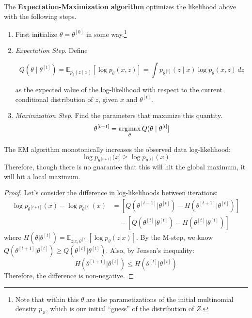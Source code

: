   \begin{algo}[EM Algorithm]
    The \textbf{Expectation-Maximization algorithm} optimizes the likelihood above with the following steps. 
    \begin{enumerate}
      \item First initialize $\theta = \theta^{[0]}$ in some way.\footnote{Note that within this $\theta$ are the parametizations of the initial multinomial density $p_Z$, which is our initial ``guess'' of the distribution of $Z$.}

      \item \textit{Expectation Step}. Define 

      \begin{equation}
        Q(\theta \mid \theta^{[t]}) = \mathbb{E}_{p_\theta (z \mid x)}[ \log p_\theta(x, z) ] = \int p_{\theta^{[t]}} (z \mid x) \log{p_\theta (x, z)} \,dz
      \end{equation}

      as the expected value of the log-likelihood with respect to the current conditional distribution of $z$, given $x$ and $\theta^{[t]}$. 

      \item \textit{Maximization Step}. Find the parameters that maximize this quantity. 
      \begin{equation}
        \theta^{[t+1]} = \argmax_\theta Q(\theta \mid \theta^{[t]}]
      \end{equation}
    \end{enumerate}
  \end{algo}

  \begin{theorem}[EM Monotonicity]
    The EM algorithm monotonically increases the observed data log-likelihood:
    \begin{equation}
      \log p_{\theta^{[t+1]}}(x] \geq \log p_{\theta^{[t]}}(x)
    \end{equation}
    Therefore, though there is no guarantee that this will hit the global maximum, it will hit a local maximum. 
  \end{theorem}
  \begin{proof}
    Let's consider the difference in log-likelihoods between iterations:
    \begin{align}
      \log p_{\theta^{[t+1]}}(x) - \log p_{\theta^{[t]}}(x) &= \left[Q(\theta^{[t+1]}|\theta^{[t]}) - H(\theta^{[t+1]}|\theta^{[t]})\right] \\
      &\quad - \left[Q(\theta^{[t]}|\theta^{[t]}) - H(\theta^{[t]}|\theta^{[t]})\right]
    \end{align}
    where $H(\theta|\theta^{[t]}) = \mathbb{E}_{z|x,\theta^{[t]}}[\log p_{\theta}(z|x)]$. By the M-step, we know $Q(\theta^{[t+1]}|\theta^{[t]}) \geq Q(\theta^{[t]}|\theta^{[t]})$. Also, by Jensen's inequality:
    \begin{equation}
      H(\theta^{[t+1]}|\theta^{[t]}) \leq H(\theta^{[t]}|\theta^{[t]})
    \end{equation}
    Therefore, the difference is non-negative.
  \end{proof}

